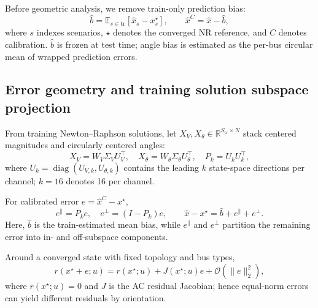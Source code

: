 \documentclass{article}
\begin{document}
Before geometric analysis, we remove train-only prediction bias:
\[
\hat b=\mathbb{E}_{s\in\mathrm{tr}}[\hat x_s-x_s^\star],
\qquad
\hat x^C=\hat x-\hat b,
\]
where $s$ indexes scenarios, $\star$ denotes the converged NR reference,
and $C$ denotes calibration. $\hat b$ is frozen at test time; angle bias is estimated as the
per-bus circular mean of wrapped prediction errors.

\subsection{Error geometry and training solution subspace projection}

From training Newton--Raphson solutions, let
$X_V,X_\theta\in\mathbb{R}^{S_{\mathrm{tr}}\times N}$ stack centered
magnitudes and circularly centered angles:
\begin{equation}
X_V=W_V\Sigma_VU_V^\top,\quad
X_\theta=W_\theta\Sigma_\theta U_\theta^\top,\quad
P_k=U_kU_k^\top,
\end{equation}
where $U_k=\operatorname{diag}(U_{V,k},U_{\theta,k})$ contains the
leading $k$ state-space directions per channel; $k=16$ denotes 16 per channel.


For calibrated error $e=\hat x^C-x^\star$,
\begin{equation}
e^{\parallel}=P_ke,\quad
e^{\perp}=(I-P_k)e,\qquad
\hat x-x^\star=\hat b+e^{\parallel}+e^{\perp}.
\label{eq:error_decomposition}
\end{equation}
Here, $\hat b$ is the train-estimated mean bias, while
$e^{\parallel}$ and $e^{\perp}$ partition the remaining error into
in- and off-subspace components.

Around a converged state with fixed topology and bus types,
\begin{equation}
r(x^\star+e;u)
=
r(x^\star;u)+J(x^\star;u)e+\mathcal{O}(\|e\|_2^2),
\label{eq:local_residual}
\end{equation}
where $r(x^\star;u)=0$ and $J$ is the AC residual Jacobian; hence
equal-norm errors can yield different residuals by orientation.

\end{document}
